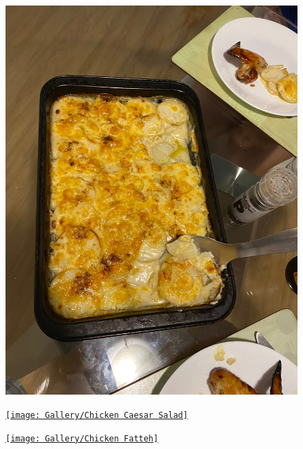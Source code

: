 \documentclass[]{article}
\begin{document}
\newpage\begin{figure}[H]
\begin{center}\hyperref[rec:Potato Gratin]{\includegraphics[keepaspectratio,width=\textwidth,height=\textheight]{Gallery/Potato Gratin}}\caption*{}\label{fig:Potato Gratin}\end{center}
\end{figure}
\newpage\begin{figure}[H]
\begin{center}\hyperref[rec:Chicken Caesar Salad]{\texttt{[image: Gallery/Chicken Caesar Salad]}}\caption*{}\label{fig:Chicken Caesar Salad}\end{center}
\end{figure}
\newpage\begin{figure}[H]
\begin{center}\hyperref[rec:Chicken Fatteh]{\texttt{[image: Gallery/Chicken Fatteh]}}\caption*{}\label{fig:Chicken Fatteh}\end{center}
\end{figure}
\end{document}
